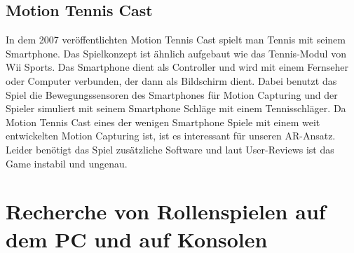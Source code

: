 \documentclass[extern,palatino]{cgBA}
\begin{document}
	\subsection{Motion Tennis Cast}\label{mtc}
	In dem 2007 veröffentlichten Motion Tennis Cast spielt man Tennis mit seinem Smartphone. Das Spielkonzept ist ähnlich aufgebaut wie das Tennis-Modul von Wii Sports. Das Smartphone dient als Controller und wird mit einem Fernseher oder Computer verbunden, der dann als Bildschirm dient. Dabei benutzt das Spiel die Bewegungssensoren des Smartphones für Motion Capturing und der Spieler simuliert mit seinem Smartphone Schläge mit einem Tennisschläger.\cite{mtc} Da Motion Tennis Cast eines der wenigen Smartphone Spiele mit einem weit entwickelten Motion Capturing ist, ist es interessant für unseren AR-Ansatz. Leider benötigt das Spiel zusätzliche Software und laut User-Reviews ist das Game instabil und ungenau\cite{mtc}.
	\newpage
	
	\section{Recherche von Rollenspielen auf dem PC und auf Konsolen}\label{re_pc}
	
\end{document}
